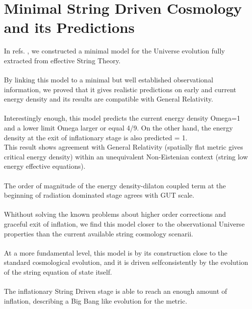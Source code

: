 \documentclass[12pt,a4paper]{article}
\begin{document}
\section{Minimal String Driven Cosmology and its Predictions}
In refs. \cite{is1}, \cite{is2} we constructed a minimal model for the Universe evolution fully extracted from
effective String Theory. \\ \\
By linking this model to a minimal but well established observational 
information, we proved that it gives realistic predictions on early and current energy density and its results are compatible with General Relativity. \\ \\
Interestingly enough, this model predicts the current energy density 
Omega=1 
and a lower limit Omega larger or equal 4/9. On the other hand, 
the energy density at the exit of inflationary stage is also predicted 
\coordHE{} = 1.\\
This result shows  agreement with General Relativity (spatially flat metric 
gives critical energy density) within an unequivalent Non-Eistenian context 
(string low energy effective equations).\\ \\
The order of magnitude of the energy density-dilaton coupled term at the 
beginning of radiation dominated stage agrees with GUT scale.\\ \\
Whithout solving the known problems about higher order corrections and 
graceful exit of inflation, we find this model closer to the observational 
Universe properties than the current available string cosmology scenarii.\\ \\
At a more fundamental level, this model is by its construction close to the 
standard cosmological evolution, and it is driven selfconsistently by the 
evolution of the string equation of state itself. \\ \\
The inflationary String Driven stage is able to reach an enough amount of 
inflation, describing a Big Bang like evolution for the metric.\\
\end{document}
